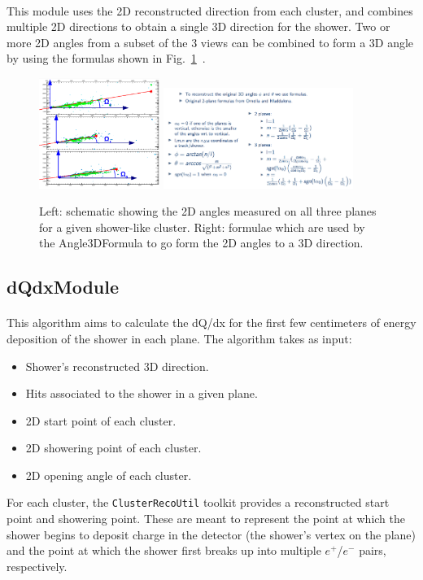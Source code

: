 \paragraph{}This module uses the 2D reconstructed direction from each cluster, and combines multiple 2D directions to obtain a single 3D direction for the shower. Two or more 2D angles from a subset of the 3 views can be combined to form a 3D angle by using the formulas shown in Fig.~\ref{fig:Angle3DFormula}~\cite{bib:showerreco3DDir}.
\begin{figure}[H]
\centering
\includegraphics[width=0.35\textwidth]{figures/Angle3DFormula_00.png}
\includegraphics[width=0.55\textwidth]{figures/Angle3DFormula_01.png}
\caption{Left: schematic showing the 2D angles measured on all three planes for a given shower-like cluster. Right: formulae which are used by the Angle3DFormula to go form the 2D angles to a 3D direction.}
\label{fig:Angle3DFormula}
\end{figure}

\subsection{dQdxModule}
\paragraph{}This algorithm aims to calculate the dQ/dx for the first few centimeters of energy deposition of the shower in each plane. The algorithm takes as input:
\begin{itemize}
\item Shower's reconstructed 3D direction.
\item Hits associated to the shower in a given plane.
\item 2D start point of each cluster.
\item 2D showering point of each cluster.
\item 2D opening angle of each cluster.
\end{itemize}
For each cluster, the \texttt{ClusterRecoUtil} toolkit provides a reconstructed start point and showering point. These are meant to represent the point at which the shower begins to deposit charge in the detector (the shower's vertex on the plane) and the point at which the shower first breaks up into multiple $e^+$/$e^-$ pairs, respectively.
